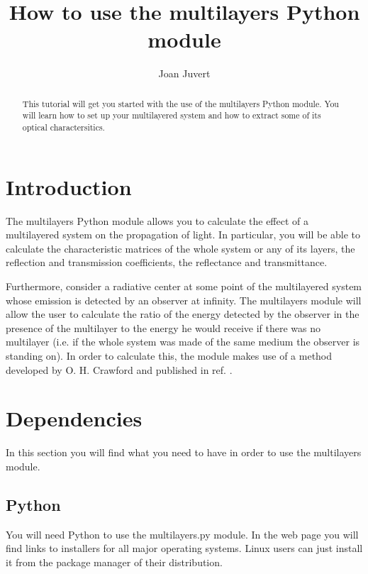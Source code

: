 \documentclass[a4paper,11pt,aps,final]{revtex4}
\begin{document}
\title{How to use the \textsf{multilayers} \textsf{Python} module}
\author{Joan Juvert}

\begin{abstract}
This tutorial will get you started with the use of the \textsf{multilayers} \textsf{Python} module. You will learn how to set up your multilayered system and how to extract some of its optical charactersitics.

\end{abstract}

\maketitle

\section{Introduction}
The \textsf{multilayers} \textsf{Python} module allows you to calculate the effect of a multilayered system on the propagation of light. In particular, you will be able to calculate the characteristic matrices of the whole system or any of its layers, the reflection and transmission coefficients, the reflectance and transmittance\cite{born00}.

Furthermore, consider a radiative center at some point of the multilayered system whose emission is detected by an observer at infinity. The \textsf{multilayers} module will allow the user to calculate the ratio of the energy detected by the observer in the presence of the multilayer to the energy he would receive if there was no multilayer (i.e. if the whole system was made of the same medium the observer is standing on). In order to calculate this, the module makes use of a method developed by O. H. Crawford and published in ref. .

\section{Dependencies}
In this section you will find what you need to have in order to use the \textsf{multilayers} module.

\subsection{\textsf{Python}}
You will need \textsf{Python} to use the \textsf{multilayers.py} module. In the web page\cite{python} you will find links to installers for all major operating systems. Linux users can just install it from the package manager of their distribution.
\end{document}
